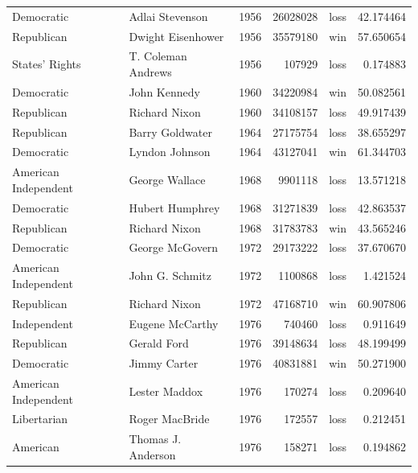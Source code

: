\documentclass[
  letterpaper,
  DIV=11,
  numbers=noendperiod]{scrreprt}
\begin{document}
\begin{tabular}{llrrlr}
Democratic            &         Adlai Stevenson &  1956 &      26028028 &   loss &  42.174464 \\
Republican            &       Dwight Eisenhower &  1956 &      35579180 &    win &  57.650654 \\
States' Rights        &      T. Coleman Andrews &  1956 &        107929 &   loss &   0.174883 \\
Democratic            &            John Kennedy &  1960 &      34220984 &    win &  50.082561 \\
Republican            &           Richard Nixon &  1960 &      34108157 &   loss &  49.917439 \\
Republican            &         Barry Goldwater &  1964 &      27175754 &   loss &  38.655297 \\
Democratic            &          Lyndon Johnson &  1964 &      43127041 &    win &  61.344703 \\
American Independent  &          George Wallace &  1968 &       9901118 &   loss &  13.571218 \\
Democratic            &         Hubert Humphrey &  1968 &      31271839 &   loss &  42.863537 \\
Republican            &           Richard Nixon &  1968 &      31783783 &    win &  43.565246 \\
Democratic            &         George McGovern &  1972 &      29173222 &   loss &  37.670670 \\
American Independent  &         John G. Schmitz &  1972 &       1100868 &   loss &   1.421524 \\
Republican            &           Richard Nixon &  1972 &      47168710 &    win &  60.907806 \\
Independent           &         Eugene McCarthy &  1976 &        740460 &   loss &   0.911649 \\
Republican            &             Gerald Ford &  1976 &      39148634 &   loss &  48.199499 \\
Democratic            &            Jimmy Carter &  1976 &      40831881 &    win &  50.271900 \\
American Independent  &           Lester Maddox &  1976 &        170274 &   loss &   0.209640 \\
Libertarian           &          Roger MacBride &  1976 &        172557 &   loss &   0.212451 \\
American              &      Thomas J. Anderson &  1976 &        158271 &   loss &   0.194862 \\

\end{tabular}
\end{document}
